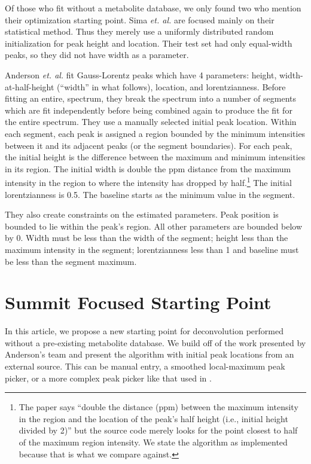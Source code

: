 \documentclass[10pt,letterpaper]{article}
\begin{document}
Of those who fit without a metabolite database, we only found two who mention their optimization starting point.
Sima \textit{et. al.}\cite{Sima2006} are focused mainly on their statistical method. Thus they merely use a 
uniformly distributed random initialization for peak height and location. Their test set had only equal-width
peaks, so they did not have width as a parameter.

Anderson \textit{et. al.}\cite{Anderson2012} fit Gauss-Lorentz peaks which have 4 parameters: height, 
width-at-half-height (``width'' in what follows), location, and lorentzianness. Before fitting an entire, 
spectrum, they break the spectrum into a number of segments which are fit independently before being
combined again to produce the fit for the entire spectrum. They use a manually selected 
initial peak location. Within each segment, each peak is assigned a region bounded by the minimum intensities 
between it and its adjacent peaks (or the segment boundaries). For each peak, the initial height is the 
difference between the maximum and minimum intensities in its region. The initial width is double the ppm 
distance from the maximum intensity in the region to where the intensity has dropped by half.\footnote{
The paper says ``double the distance (ppm) between the maximum intensity in the region and the
location of the peak’s half height (i.e., initial height divided by 2)'' but the source code merely looks for
the point closest to half of the maximum region intensity. We state the algorithm as implemented because that
is what we compare against.} The initial lorentzianness is 0.5. The baseline starts as the minimum value in 
the segment.

They also create constraints on the estimated parameters. Peak position is bounded to lie within the peak's region.
All other parameters are bounded below by 0. Width must be less than the width of the segment; height less
than the maximum intensity in the segment; lorentzianness less than 1 and baseline must be less than the segment
maximum.
\section{Summit Focused Starting Point}
In this article, we propose a new starting point for deconvolution performed without a pre-existing metabolite 
database. We build off of the work presented by Anderson's team and present the algorithm with initial peak
locations from an external source. This can be manual entry, a smoothed local-maximum peak picker, or a more
complex peak picker like that used in \cite{Alm2009}.
\end{document}
